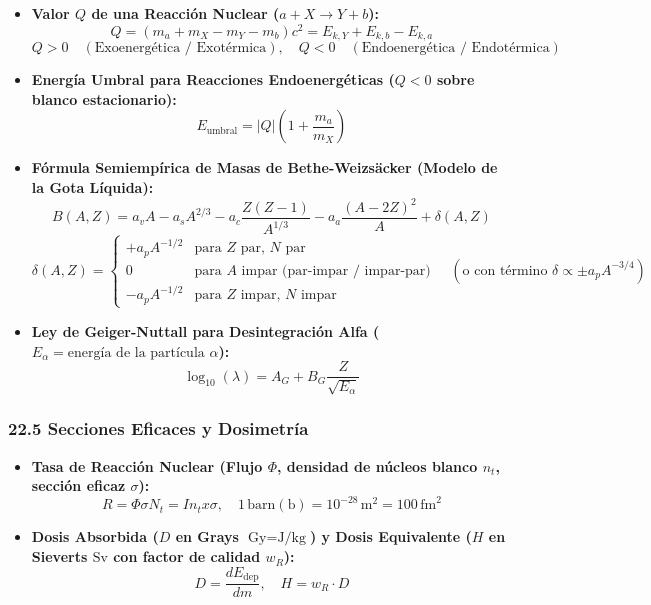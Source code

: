 \documentclass[11pt,a4paper]{article}
\begin{document}
\begin{itemize}
  \item \textbf{Valor $Q$ de una Reacción Nuclear ($a + X \to Y + b$):}
  \[
    Q = (m_a + m_X - m_Y - m_b) c^2 = E_{k,Y} + E_{k,b} - E_{k,a}
  \]
  \[
    Q > 0 \quad (\text{Exoenergética / Exotérmica}), \quad Q < 0 \quad (\text{Endoenergética / Endotérmica})
  \]
  \item \textbf{Energía Umbral para Reacciones Endoenergéticas ($Q < 0$ sobre blanco estacionario):}
  \[
    E_{\text{umbral}} = |Q|\left( 1 + \frac{m_a}{m_X} \right)
  \]
  \item \textbf{Fórmula Semiempírica de Masas de Bethe-Weizsäcker (Modelo de la Gota Líquida):}
  \[
    B(A, Z) = a_v A - a_s A^{2/3} - a_c \frac{Z(Z - 1)}{A^{1/3}} - a_a \frac{(A - 2Z)^2}{A} + \delta(A, Z)
  \]
  \[
    \delta(A, Z) = \begin{cases} +a_p A^{-1/2} & \text{para } Z \text{ par, } N \text{ par} \\ 0 & \text{para } A \text{ impar (par-impar / impar-par)} \\ -a_p A^{-1/2} & \text{para } Z \text{ impar, } N \text{ impar} \end{cases} \quad (\text{o con término } \delta \propto \pm a_p A^{-3/4})
  \]
  \item \textbf{Ley de Geiger-Nuttall para Desintegración Alfa ($E_\alpha = \text{energía de la partícula } \alpha$):}
  \[
    \log_{10}(\lambda) = A_G + B_G \frac{Z}{\sqrt{E_\alpha}}
  \]
\end{itemize}

\subsubsection*{22.5 Secciones Eficaces y Dosimetría}

\begin{itemize}
  \item \textbf{Tasa de Reacción Nuclear (Flujo $\Phi$, densidad de núcleos blanco $n_t$, sección eficaz $\sigma$):}
  \[
    R = \Phi \sigma N_t = I n_t x \sigma, \quad 1 \, \text{barn} (\text{b}) = 10^{-28} \, \text{m}^2 = 100 \, \text{fm}^2
  \]
  \item \textbf{Dosis Absorbida ($D$ en Grays $\text{Gy} = \text{J/kg}$) y Dosis Equivalente ($H$ en Sieverts $\text{Sv}$ con factor de calidad $w_R$):}
  \[
    D = \frac{dE_{\text{dep}}}{dm}, \quad H = w_R \cdot D
  \]
\end{itemize}
\end{document}
